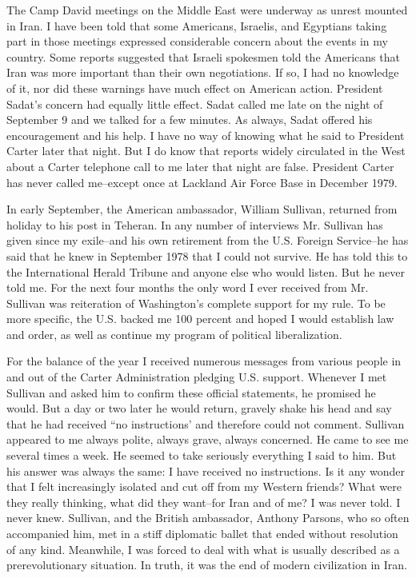 The Camp David meetings on the Middle East were underway as unrest mounted in Iran. I have been told that some Americans, Israelis, and Egyptians taking part in those meetings expressed considerable concern about the events in my country. Some reports suggested that Israeli spokesmen told the Americans that Iran was more important than their own negotiations. If so, I had no knowledge of it, nor did these warnings have much effect on American action. President Sadat’s concern had equally little effect. Sadat called me late on the night of September 9 and we talked for a few minutes. As always, Sadat offered his encouragement and his help. I have no way of knowing what he said to President Carter later that night. But I do know that reports widely circulated in the West about a Carter telephone call to me later that night are false. President Carter has never called me--except once at Lackland Air Force Base in December 1979. 

In early September, the American ambassador, William Sullivan, returned from holiday to his post in Teheran. In any number of interviews Mr. Sullivan has given since my exile--and his own retirement from the U.S. Foreign Service--he has said that he knew in September 1978 that I could not survive. He has told this to the International Herald Tribune and anyone else who would listen. But he never told me. For the next four months the only word I ever received from Mr. Sullivan was reiteration of Washington's complete support for my rule. To be more specific, the U.S. backed me 100 percent and hoped I would establish law and order, as well as continue my program of political liberalization. 

For the balance of the year I received numerous messages from various people in and out of the Carter Administration pledging U.S. support. Whenever I met Sullivan and asked him to confirm these official statements, he promised he would. But a day or two later he would return, gravely shake his head and say that he had received “no instructions’ and therefore could not comment. Sullivan appeared to me always polite, always grave, always concerned. He came to see me several times a week. He seemed to take seriously everything I said to him. But his answer was always the same: I have received no instructions. Is it any wonder that I felt increasingly isolated and cut off from my Western friends? What were they really thinking, what did they want--for Iran and of me? I was never told. I never knew. Sullivan, and the British ambassador, Anthony Parsons, who so often accompanied him, met in a stiff diplomatic ballet that ended without resolution of any kind. Meanwhile, I was forced to deal with what is usually described as a prerevolutionary situation. In truth, it was the end of modern civilization in Iran. 

